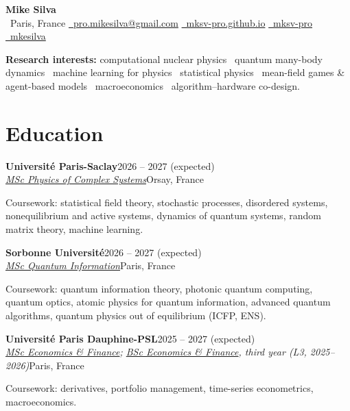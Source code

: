 \documentclass[a4paper,9pt]{extarticle}
\newcommand{\entry}[4]{%
  \textbf{#1}\hfill #4\\
  \textit{#3}\hfill {\color{muted}#2}\par}
\newcommand{\coursework}[1]{{\small\color{muted}Coursework: #1}\par\vspace{2pt}}
\begin{document}
\begin{center}
  {\LARGE\textbf{Mike Silva}}\\[4pt]
  \small
  \newcommand{\ico}[1]{{\color{muted}#1}~}%
  \ico{\faMapMarker*}Paris, France \qquad
  \href{mailto:pro.mikesilva@gmail.com}{\ico{\faEnvelope}pro.mikesilva@gmail.com} \qquad
  \href{https://mksv-pro.github.io}{\ico{\faGlobe}mksv-pro.github.io} \qquad
  \href{https://github.com/mksv-pro}{\ico{\faGithub}mksv-pro} \qquad
  \href{https://www.linkedin.com/in/mkesilva/}{\ico{\faLinkedin}mkesilva}
\end{center}

\textbf{Research interests:} computational nuclear physics~\textperiodcentered{} quantum many-body dynamics~\textperiodcentered{} machine learning for physics~\textperiodcentered{} statistical physics~\textperiodcentered{} mean-field games \& agent-based models~\textperiodcentered{} macroeconomics~\textperiodcentered{} algorithm–hardware co-design.

\section*{Education}

\entry{Université Paris-Saclay}{Orsay, France}{\href{https://www.universite-paris-saclay.fr/en/education/masters-degree/physique-fondamentale-et-applications/m2-complex-systems}{MSc Physics of Complex Systems}}{2026 -- 2027 (expected)}
\coursework{statistical field theory, stochastic processes, disordered systems, nonequilibrium and active systems, dynamics of quantum systems, random matrix theory, machine learning.}

\entry{Sorbonne Université}{Paris, France}{\href{https://sciences.sorbonne-universite.fr/en/study/degree-seeking/masters/master-fundamental-physics-and-applications/m2-quantum-information-iq}{MSc Quantum Information}}{2026 -- 2027 (expected)}
\coursework{quantum information theory, photonic quantum computing, quantum optics, atomic physics for quantum information, advanced quantum algorithms, quantum physics out of equilibrium (ICFP, ENS).}

\entry{Université Paris Dauphine-PSL}{Paris, France}{\href{https://dauphine.psl.eu/formations/masters/economie-finance}{MSc Economics \& Finance}; \href{https://dauphine.psl.eu/formations/licences/economie-appliquee/l3-economie-et-ingenierie-financieres}{BSc Economics \& Finance}, third year (L3, 2025–2026)}{2025 -- 2027 (expected)}
\coursework{derivatives, portfolio management, time-series econometrics, macroeconomics.}
\end{document}
